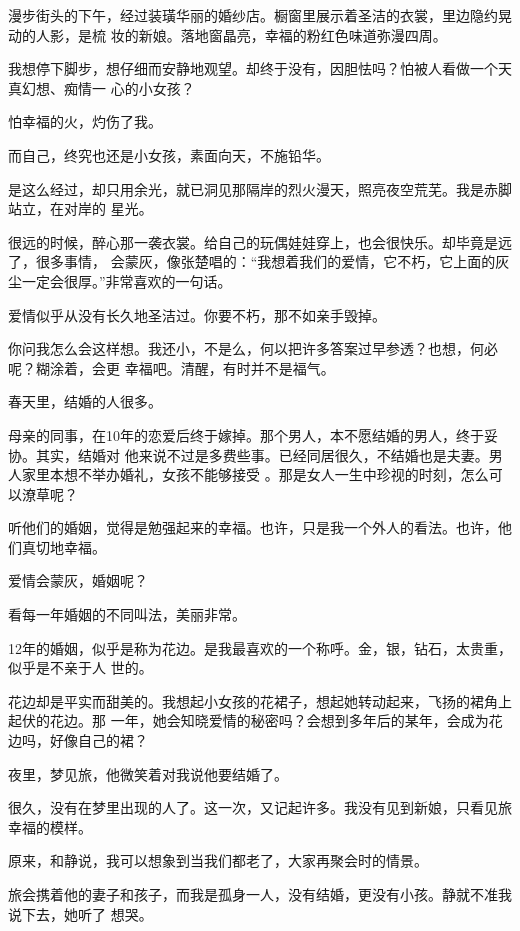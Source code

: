\documentclass[12pt,a4paper]{article}
\begin{document}
	\endwriting



		漫步街头的下午，经过装璜华丽的婚纱店。橱窗里展示着圣洁的衣裳，里边隐约晃动的人影，是梳
	妆的新娘。落地窗晶亮，幸福的粉红色味道弥漫四周。

		我想停下脚步，想仔细而安静地观望。却终于没有，因胆怯吗？怕被人看做一个天真幻想、痴情一
	心的小女孩？

		怕幸福的火，灼伤了我。

		而自己，终究也还是小女孩，素面向天，不施铅华。

		是这么经过，却只用余光，就已洞见那隔岸的烈火漫天，照亮夜空荒芜。我是赤脚站立，在对岸的
	星光。

		很远的时候，醉心那一袭衣裳。给自己的玩偶娃娃穿上，也会很快乐。却毕竟是远了，很多事情，
	会蒙灰，像张楚唱的：“我想着我们的爱情，它不朽，它上面的灰尘一定会很厚。”非常喜欢的一句话。

		爱情似乎从没有长久地圣洁过。你要不朽，那不如亲手毁掉。

		你问我怎么会这样想。我还小，不是么，何以把许多答案过早参透？也想，何必呢？糊涂着，会更
	幸福吧。清醒，有时并不是福气。

		春天里，结婚的人很多。

		母亲的同事，在10年的恋爱后终于嫁掉。那个男人，本不愿结婚的男人，终于妥协。其实，结婚对
	他来说不过是多费些事。已经同居很久，不结婚也是夫妻。男人家里本想不举办婚礼，女孩不能够接受
	。那是女人一生中珍视的时刻，怎么可以潦草呢？

		听他们的婚姻，觉得是勉强起来的幸福。也许，只是我一个外人的看法。也许，他们真切地幸福。

		爱情会蒙灰，婚姻呢？

		看每一年婚姻的不同叫法，美丽非常。

		12年的婚姻，似乎是称为花边。是我最喜欢的一个称呼。金，银，钻石，太贵重，似乎是不亲于人
	世的。

		花边却是平实而甜美的。我想起小女孩的花裙子，想起她转动起来，飞扬的裙角上起伏的花边。那
	一年，她会知晓爱情的秘密吗？会想到多年后的某年，会成为花边吗，好像自己的裙？

		夜里，梦见旅，他微笑着对我说他要结婚了。

		很久，没有在梦里出现的人了。这一次，又记起许多。我没有见到新娘，只看见旅幸福的模样。

		原来，和静说，我可以想象到当我们都老了，大家再聚会时的情景。

		旅会携着他的妻子和孩子，而我是孤身一人，没有结婚，更没有小孩。静就不准我说下去，她听了
	想哭。
\end{document}
